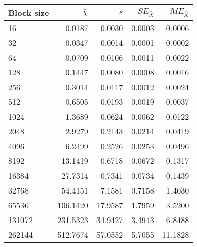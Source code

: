 \begin{tabular}{lrrrr}\toprule
{\small Block size} & $\bar{X}$ & $s$ & $SE_{\bar{X}}$ & $ME_{\bar{X}}$ \\\midrule
16 & 0.0187 & 0.0030 & 0.0003 & 0.0006\\
32 & 0.0347 & 0.0014 & 0.0001 & 0.0002\\
64 & 0.0709 & 0.0106 & 0.0011 & 0.0022\\
128 & 0.1447 & 0.0080 & 0.0008 & 0.0016\\
256 & 0.3014 & 0.0117 & 0.0012 & 0.0024\\
512 & 0.6505 & 0.0193 & 0.0019 & 0.0037\\
1024 & 1.3689 & 0.0624 & 0.0062 & 0.0122\\
2048 & 2.9279 & 0.2143 & 0.0214 & 0.0419\\
4096 & 6.2499 & 0.2526 & 0.0253 & 0.0496\\
8192 & 13.1419 & 0.6718 & 0.0672 & 0.1317\\
16384 & 27.7314 & 0.7341 & 0.0734 & 0.1439\\
32768 & 54.4151 & 7.1581 & 0.7158 & 1.4030\\
65536 & 106.1420 & 17.9587 & 1.7959 & 3.5200\\
131072 & 231.5323 & 34.9427 & 3.4943 & 6.8488\\
262144 & 512.7674 & 57.0552 & 5.7055 & 11.1828\\
\bottomrule
\end{tabular}

